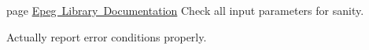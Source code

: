 
\begin{DoxyRefList}
\item[page \mbox{\hyperlink{index}{Epeg Library Documentation}} ]\label{todo__todo000001}%
%
Check all input parameters for sanity. 

Actually report error conditions properly.
\end{DoxyRefList}